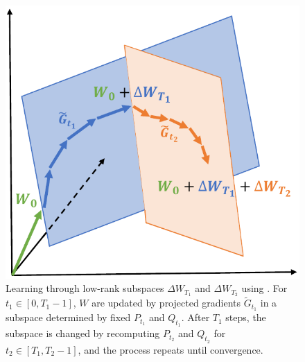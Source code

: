 \begin{figure}
    \centering
    \includegraphics[width=0.58\linewidth]{figures/files/subspace_learning.pdf}
    \caption{\small{ Learning through low-rank subspaces $\Delta W_{T_1}$ and $\Delta W_{T_2}$ using \lowrank{}. For $t_1 \in [0, T_1 - 1]$, $W$ are updated by projected gradients $\tilde G_{t_1}$ in a subspace determined by fixed $P_{t_1}$ and $Q_{t_1}$. After $T_1$ steps, the subspace is changed by recomputing $P_{t_2}$ and $Q_{t_2}$ for $t_2 \in [T_1, T_2 - 1]$, and the process repeats until convergence.}}
    \label{fig:subspace_learning}
\vspace{-3mm}
\end{figure}
